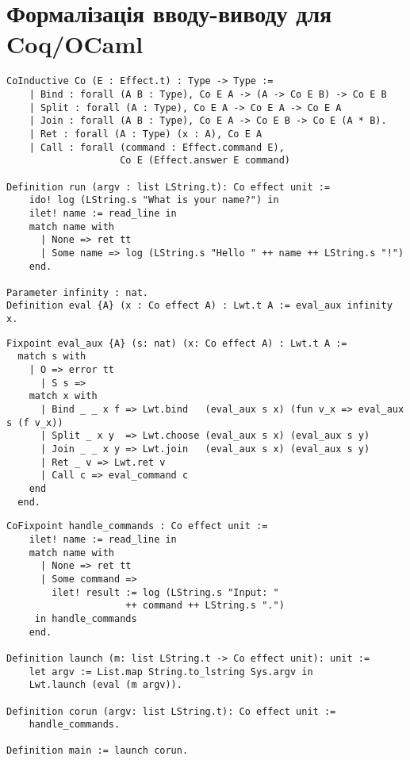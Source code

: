 \newpage
\section{Формалізація вводу-виводу для Coq/OCaml}

\begin{lstlisting}
CoInductive Co (E : Effect.t) : Type -> Type :=
    | Bind : forall (A B : Type), Co E A -> (A -> Co E B) -> Co E B
    | Split : forall (A : Type), Co E A -> Co E A -> Co E A
    | Join : forall (A B : Type), Co E A -> Co E B -> Co E (A * B).
    | Ret : forall (A : Type) (x : A), Co E A
    | Call : forall (command : Effect.command E),
                    Co E (Effect.answer E command)

Definition run (argv : list LString.t): Co effect unit :=
    ido! log (LString.s "What is your name?") in
    ilet! name := read_line in
    match name with
      | None => ret tt
      | Some name => log (LString.s "Hello " ++ name ++ LString.s "!")
    end.

Parameter infinity : nat.
Definition eval {A} (x : Co effect A) : Lwt.t A := eval_aux infinity x.
\end{lstlisting}

\begin{lstlisting}
Fixpoint eval_aux {A} (s: nat) (x: Co effect A) : Lwt.t A :=
  match s with
    | O => error tt
      | S s =>
    match x with
      | Bind _ _ x f => Lwt.bind   (eval_aux s x) (fun v_x => eval_aux s (f v_x))
      | Split _ x y  => Lwt.choose (eval_aux s x) (eval_aux s y)
      | Join _ _ x y => Lwt.join   (eval_aux s x) (eval_aux s y)
      | Ret _ v => Lwt.ret v
      | Call c => eval_command c
    end
  end.
\end{lstlisting}

\begin{lstlisting}
CoFixpoint handle_commands : Co effect unit :=
    ilet! name := read_line in
    match name with
      | None => ret tt
      | Some command =>
        ilet! result := log (LString.s "Input: "
                     ++ command ++ LString.s ".")
     in handle_commands
    end.

Definition launch (m: list LString.t -> Co effect unit): unit :=
    let argv := List.map String.to_lstring Sys.argv in
    Lwt.launch (eval (m argv)).

Definition corun (argv: list LString.t): Co effect unit :=
    handle_commands.

Definition main := launch corun.
\end{lstlisting}

